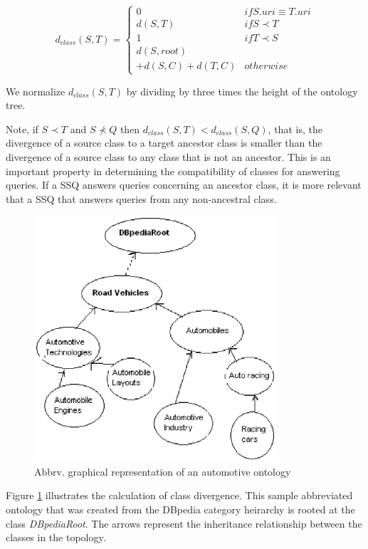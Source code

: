 \begin{equation}
d_{class}(S, T) = \begin{cases}
0 & if S.{uri} \equiv T.{uri}\\
d(S, T) & if S \prec T\\
1 & if T \prec S\\
d(S,root) \\+ d(S,C) + d(T,C) & otherwise
\end{cases}
\end{equation}

We normalize $d_{class}(S, T)$ by dividing by three times the height
of the ontology tree.

Note, if $S \prec T$ and $S \not\prec Q$ then $d_{class}(S,T) <
d_{class}(S,Q)$, that is, the divergence of a source class to a target
ancestor class is smaller than the divergence of a source class to any
class that is not an ancestor. This is an important property in
determining the compatibility of classes for answering queries.  If a
SSQ answers queries concerning an ancestor class, it is more relevant
that a SSQ that answers queries from any non-ancestral class.

\begin{figure}[t]
\centering
\includegraphics[width=90mm]{class_divergence.eps}
\caption{Abbrv. graphical representation of an automotive ontology}
\label{fig:class_divergence}
\end{figure}

Figure \ref{fig:class_divergence} illustrates the calculation of class
divergence. This sample abbreviated ontology that was created from the
DBpedia category heirarchy is rooted at the class
\textit{DBpediaRoot}. The arrows represent the inheritance
relationship between the classes in the topology.

